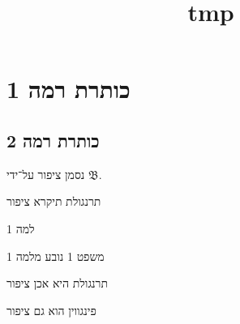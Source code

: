 
\title{tmp}
\setcounter{secnumdepth}{2}



\section{כותרת רמה 1}
\subsection{כותרת רמה 2}

\begin{notation}
	נסמן ציפור על־ידי $\mathfrak{B}$.
\end{notation}
\begin{definition}[תרנגולת]
	תרנגולת תיקרא ציפור
\end{definition}
\begin{lemma}
	למה 1
\end{lemma}
\begin{theorem}
	משפט 1
	נובע מלמה 1
\end{theorem}
\begin{conclusion}
	תרנגולת היא אכן ציפור
\end{conclusion}
\begin{example}
	פינגווין הוא גם ציפור
\end{example}


